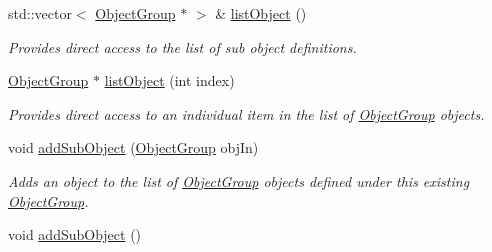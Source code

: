 \begin{DoxyCompactItemize}
std\-::vector$<$ \hyperlink{classosea_1_1_object_group}{Object\-Group} $\ast$ $>$ \& \hyperlink{classosea_1_1_object_group_a13cd6186adf626bf61b279f1f6f75790}{list\-Object} ()
\begin{DoxyCompactList}\small\item\em Provides direct access to the list of sub object definitions. \end{DoxyCompactList}\item 
\hyperlink{classosea_1_1_object_group}{Object\-Group} $\ast$ \hyperlink{classosea_1_1_object_group_a0a080e78f85ad74d3920d8d4d2896ff4}{list\-Object} (int index)
\begin{DoxyCompactList}\small\item\em Provides direct access to an individual item in the list of \hyperlink{classosea_1_1_object_group}{Object\-Group} objects. \end{DoxyCompactList}\item 
void \hyperlink{classosea_1_1_object_group_ab705c0409d674106c28518368e5108ad}{add\-Sub\-Object} (\hyperlink{classosea_1_1_object_group}{Object\-Group} obj\-In)
\begin{DoxyCompactList}\small\item\em Adds an object to the list of \hyperlink{classosea_1_1_object_group}{Object\-Group} objects defined under this existing \hyperlink{classosea_1_1_object_group}{Object\-Group}. \end{DoxyCompactList}\item 
\hypertarget{classosea_1_1_object_group_a71804670b83abe0c161f5fdebc598373}{void \hyperlink{classosea_1_1_object_group_a71804670b83abe0c161f5fdebc598373}{add\-Sub\-Object} ()}\label{classosea_1_1_object_group_a71804670b83abe0c161f5fdebc598373}


\end{DoxyCompactItemize}
